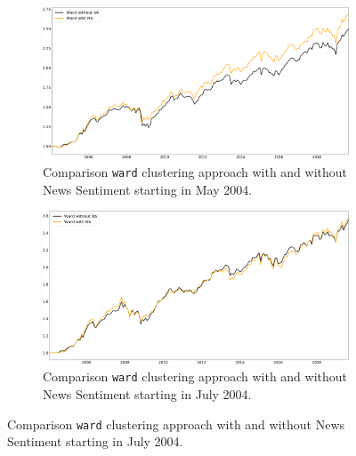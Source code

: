 \newpage
\begin{figure}[H] %
\centering

\begin{subfigure}{0.8\textwidth}%
\centering
\includegraphics[width=\linewidth]{Plots_and_Tables/perf_noTC_ward_comp_F_2_B_0_LB_12_3_!!}
\caption{Comparison \texttt{ward} clustering approach with and without News Sentiment starting in May 2004.} \label{fig:notc_noNS_perf} %
\end{subfigure}%

\medskip
\begin{subfigure}{0.8\textwidth}%
\centering
\includegraphics[width=\linewidth]{Plots_and_Tables/perf_noTC_ward_comp_F_2_B_0_LB_12_5_!!}
\caption{Comparison \texttt{ward} clustering approach with and without News Sentiment starting in July 2004.} \label{fig:tc_noNS_perf}
\end{subfigure}%



\end{figure}
